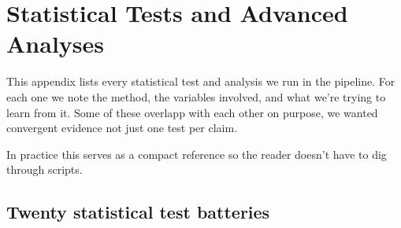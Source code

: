 \chapter{Statistical Tests and Advanced Analyses}
\label{app:tests}

This appendix lists every statistical test and analysis we run in the pipeline. For each one we note the method, the variables involved, and what we're trying to learn from it. Some of these overlapp with each other on purpose, we wanted convergent evidence not just one test per claim.

In practice this serves as a compact reference so the reader doesn't have to dig through scripts.

\section{Twenty statistical test batteries}

